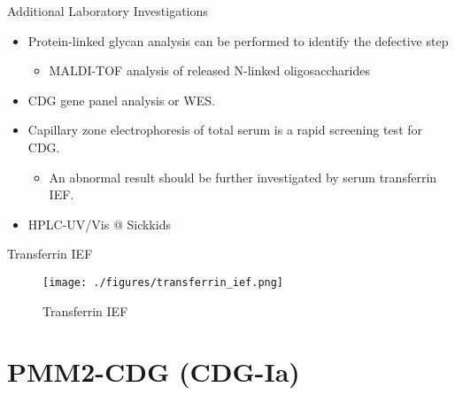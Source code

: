 \documentclass[presentation, smaller]{beamer}
\begin{document}
\begin{frame}[label={sec:org1c45496}]{Additional Laboratory Investigations}
\begin{itemize}
\item Protein-linked glycan analysis can be performed to identify the defective step
\begin{itemize}
\item MALDI-TOF analysis of released N-linked oligosaccharides
\end{itemize}
\item CDG gene panel analysis or WES.

\item Capillary zone electrophoresis of total serum is a rapid screening
test for CDG.
\begin{itemize}
\item An abnormal result should be further investigated by serum
transferrin IEF.
\end{itemize}

\item HPLC-UV/Vis @ Sickkids
\end{itemize}
\end{frame}

\begin{frame}[label={sec:org60de3ad}]{Transferrin IEF}
\begin{figure}[htbp]
\centering
\texttt{[image: ./figures/transferrin\_ief.png]}
\caption{\label{fig:org60cb1fe}
Transferrin IEF}
\end{figure}
\end{frame}



\section{PMM2-CDG (CDG-Ia)}
\label{sec:org7eb4f33}
\end{document}
